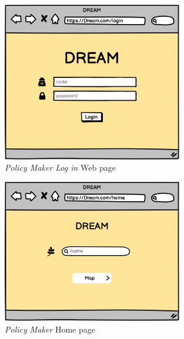 \begin{figure}[H]
    \begin{center}
    \includegraphics[width=0.7\textwidth]{mocups/PMLogIn.png}
    \caption{\emph{Policy Maker Log in} Web page}
    \label{fig:sequence1}
    \end{center}
\end{figure}

\begin{figure}[H]
    \begin{center}
    \includegraphics[width=0.7\textwidth]{mocups/PMHome.png}
    \caption{\emph{Policy Maker} Home page}
    \label{fig:sequence1}
    \end{center}
\end{figure}

